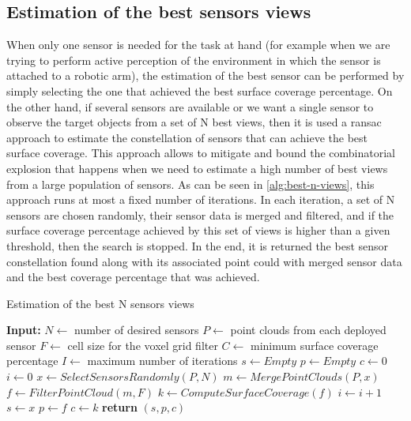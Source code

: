 \subsection{Estimation of the best sensors views}

When only one sensor is needed for the task at hand (for example when we are trying to perform active perception of the environment in which the sensor is attached to a robotic arm), the estimation of the best sensor can be performed by simply selecting the one that achieved the best surface coverage percentage. On the other hand, if several sensors are available or we want a single sensor to observe the target objects from a set of N best views, then it is used a \gls{ransac} approach to estimate the constellation of sensors that can achieve the best surface coverage. This approach allows to mitigate and bound the combinatorial explosion that happens when we need to estimate a high number of best views from a large population of sensors. As can be seen in \cref{alg:best-n-views}, this approach runs at most a fixed number of iterations. In each iteration, a set of N sensors are chosen randomly, their sensor data is merged and filtered, and if the surface coverage percentage achieved by this set of views is higher than a given threshold, then the search is stopped. In the end, it is returned the best sensor constellation found along with its associated point could with merged sensor data and the best coverage percentage that was achieved.

\begin{algorithm}
	\caption{Estimation of the best N sensors views}
	\label{alg:best-n-views}
	\begin{algorithmic}[1]
		\State \textbf{Input:}
		\State $N \gets$ number of desired sensors
		\State $P \gets$ point clouds from each deployed sensor
		\State $F \gets$ cell size for the voxel grid filter
		\State $C \gets$ minimum surface coverage percentage
		\State $I \gets$ maximum number of iterations
			\State $s \gets Empty$
			\State $p \gets Empty$
			\State $c \gets 0$
			\State $i \gets 0$
				\State $x \gets SelectSensorsRandomly(P,N)$
				\State $m \gets MergePointClouds(P,x)$
				\State $f \gets FilterPointCloud(m,F)$
				\State $k \gets ComputeSurfaceCoverage(f)$
				\State $i \gets i + 1$
					\State $s \gets x$
					\State $p \gets f$
					\State $c \gets k$
				\EndIf
			\EndWhile
			\State \textbf{return} $(s,p,c)$
		\EndProcedure
	\end{algorithmic}
\end{algorithm}
